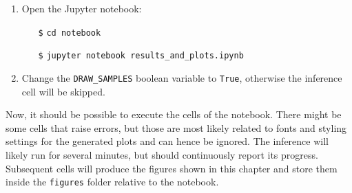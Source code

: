 \begin{tcolorbox}[title=\faIcon{recycle} Reproducibility, parbox=false]
\begin{enumerate}
        \item Open the Jupyter notebook:
        \begin{itemize}[leftmargin=10mm]
            \setlength\itemsep{-0.5em}
            \item[\texttt{\$}] \verb|cd notebook|
            \item[\texttt{\$}] \verb|jupyter notebook results_and_plots.ipynb|
        \end{itemize}

        \item Change the \verb|DRAW_SAMPLES| boolean variable to \texttt{True}, otherwise the inference cell will be skipped.
    \end{enumerate}

    Now, it should be possible to execute the cells of the notebook. There might be some cells that raise errors, but those are most likely related to fonts and styling settings for the generated plots and can hence be ignored. The inference will likely run for several minutes, but should continuously report its progress. Subsequent cells will produce the figures shown in this chapter and store them inside the  \texttt{figures} folder relative to the notebook.
\end{tcolorbox}
